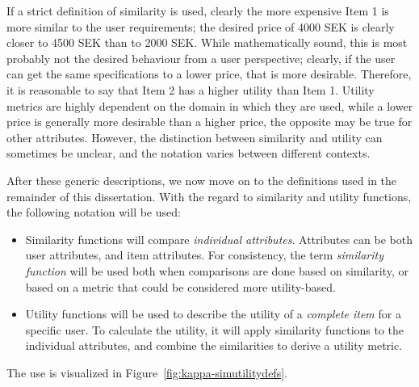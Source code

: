 If a strict definition of similarity is used, clearly the more expensive Item 1 is more similar to the user requirements; the desired price of 4000 SEK is clearly closer to 4500 SEK than to 2000 SEK.
While mathematically sound, this is most probably not the desired behaviour from a user perspective; clearly, if the user can get the same specifications to a lower price, that is more desirable.
Therefore, it is reasonable to say that Item 2 has a higher utility than Item 1.
Utility metrics are highly dependent on the domain in which they are used, while a lower price is generally more desirable than a higher price, the opposite may be true for other attributes.
However, the distinction between similarity and utility can sometimes be unclear, and the notation varies between different contexts.

After these generic descriptions, we now move on to the definitions used in the remainder of this dissertation.
With the regard to similarity and utility functions, the following notation will be used:
\begin{itemize}
	\item Similarity functions will compare \emph{individual attributes}.
	Attributes can be both user attributes, and item attributes.
	For consistency, the term \emph{similarity function} will be used both when comparisons are done based on similarity, or based on a metric that could be considered more utility-based.
	\item Utility functions will be used to describe the utility of a \emph{complete item} for a specific user.
	To calculate the utility, it will apply similarity functions to the individual attributes, and combine the similarities to derive a utility metric.
\end{itemize}
The use is visualized in Figure~\ref{fig:kappa-simutilitydefs}.
